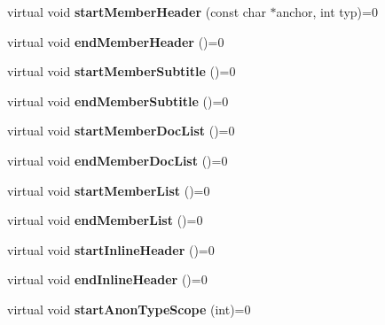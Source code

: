 \begin{DoxyCompactItemize}
\mbox{\label{class_output_generator_a2d94dfdee78dd53535b335b7f5b3c979}} 
virtual void {\bfseries start\+Member\+Header} (const char $\ast$anchor, int typ)=0
\item 
\mbox{\label{class_output_generator_a59dd3993aedf7baf7465b67d4327335e}} 
virtual void {\bfseries end\+Member\+Header} ()=0
\item 
\mbox{\label{class_output_generator_a6c10a744bfe79da169794579d92c6f38}} 
virtual void {\bfseries start\+Member\+Subtitle} ()=0
\item 
\mbox{\label{class_output_generator_a0c56a25591efb4a9b38da70757dfe46c}} 
virtual void {\bfseries end\+Member\+Subtitle} ()=0
\item 
\mbox{\label{class_output_generator_a79d92b273b6678f0484f507f9aeed930}} 
virtual void {\bfseries start\+Member\+Doc\+List} ()=0
\item 
\mbox{\label{class_output_generator_adac2120718344406921dc07cd60c8ead}} 
virtual void {\bfseries end\+Member\+Doc\+List} ()=0
\item 
\mbox{\label{class_output_generator_a55bfc9535965545c98a07fd5e94ccfde}} 
virtual void {\bfseries start\+Member\+List} ()=0
\item 
\mbox{\label{class_output_generator_af3e875ff86510c53f355c024cc3a574d}} 
virtual void {\bfseries end\+Member\+List} ()=0
\item 
\mbox{\label{class_output_generator_a75c7b7e0e20ce30957ed49fd1d1d246d}} 
virtual void {\bfseries start\+Inline\+Header} ()=0
\item 
\mbox{\label{class_output_generator_a02b0b97eaa17e069eda7cc7f3e794a91}} 
virtual void {\bfseries end\+Inline\+Header} ()=0
\item 
\mbox{\label{class_output_generator_a13587c69b6272779d38b6bc2a45fbfd5}} 
virtual void {\bfseries start\+Anon\+Type\+Scope} (int)=0

\end{DoxyCompactItemize}
